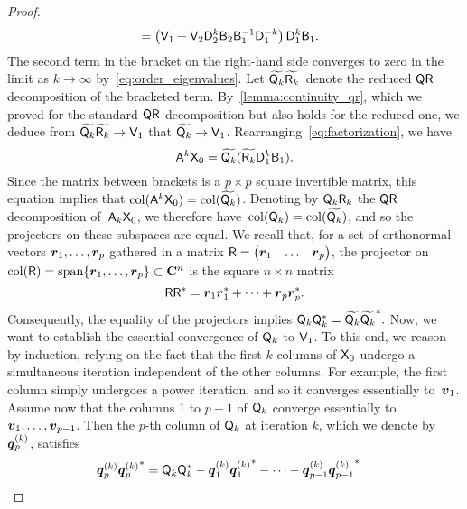 \begin{proof}
\begin{align}
        \label{eq:factorization}
        &= \left(\mathsf V_1  + \mathsf V_2 \mathsf D_2^{k} \mathsf B_2 \mathsf B_1^{-1}\mathsf D_1^{-k}\right) \mathsf D_1^k \mathsf B_1.
    \end{align}
    The second term in the bracket on the right-hand side converges to zero in the limit as $k \to \infty$ by~\eqref{eq:order_eigenvalues}.
    Let $\widetilde{\mathsf Q_k} \widetilde {\mathsf R_k}$~denote the reduced $\mathsf Q \mathsf R$ decomposition of the bracketed term.
    By~\cref{lemma:continuity_qr},
    which we proved for the standard $\mathsf Q \mathsf R$ decomposition but also holds for the reduced one,
    we deduce from $\widetilde{\mathsf Q_k} \widetilde{\mathsf R_k} \to \mathsf V_1$ that $\widetilde{\mathsf Q_k} \to \mathsf V_1$.
    Rearranging~\eqref{eq:factorization},
    we have
    \[
        \mathsf A^k \mathsf X_0 = \widetilde{\mathsf Q_k} (\widetilde{\mathsf R_k} \mathsf D_1^k \mathsf B_1).
    \]
    Since the matrix between brackets is a $p \times p$ square invertible matrix,
    this equation implies that $\operatorname{col}(\mathsf A^k \mathsf X_0) = \operatorname{col} (\widetilde{\mathsf Q_k})$.
    Denoting by $\mathsf Q_k \mathsf R_k$ the $\mathsf Q \mathsf R$ decomposition of~$\mathsf A_k \mathsf X_0$,
    we therefore have~$\operatorname{col}(\mathsf Q_k) = \operatorname{col}(\widetilde {\mathsf Q_k})$,
    and so the projectors on these subspaces are equal.
    We recall that, for a set of orthonormal vectors $\mathbf{\boldsymbol{r}}_1, \dotsc, \mathbf{\boldsymbol{r}}_p$
    gathered in a matrix $\mathsf R = \begin{pmatrix} \mathbf{\boldsymbol{r}}_1 & \hdots & \mathbf{\boldsymbol{r}}_p \end{pmatrix}$,
    the projector on $\operatorname{col}(\mathsf R) = \operatorname{span} \{\mathbf{\boldsymbol{r}}_1, \dotsc, \mathbf{\boldsymbol{r}}_p \} \subset \mathbf C^n$
    is the square $n \times n$ matrix
    \[
        \mathsf R \mathsf R^*
        = \mathbf{\boldsymbol{r}}_1 \mathbf{\boldsymbol{r}}_1^* + \dotsb + \mathbf{\boldsymbol{r}}_p \mathbf{\boldsymbol{r}}_p^*.
    \]
    Consequently,
    the equality of the projectors implies
    \(
        \mathsf Q_k \mathsf Q_k^* = \widetilde{\mathsf Q_k} \widetilde {\mathsf Q_k}^*.
    \)
    Now, we want to establish the essential convergence of $\mathsf Q_k$ to $\mathsf V_1$.
    To this end, we reason by induction,
    relying on the fact that the first $k$ columns of $\mathsf X_0$ undergo a simultaneous iteration independent of the other columns.
    For example, the first column simply undergoes a power iteration, and so it converges essentially to~$\mathbf{\boldsymbol{v}}_1$.
    Assume now that the columns 1 to $p-1$ of $\mathsf Q_k$ converge essentially to $\mathbf{\boldsymbol{v}}_1, \dotsc, \mathbf{\boldsymbol{v}}_{p-1}$.
    Then the $p$-th column of $\mathsf Q_k$ at iteration $k$,
    which we denote by~$\mathbf{\boldsymbol{q}}_p^{(k)}$,
    satisfies
    \begin{align*}
        \vect q_p^{(k)} {\vect q_p^{(k)}}^* &= \mat Q_k \mat Q_k^* - \vect q_1^{(k)} {\vect q_1^{(k)}}^* - \dotsb - \vect q_{p-1}^{(k)} {\vect q_{p-1}^{(k)}}^*

\end{align*}
\end{proof}
